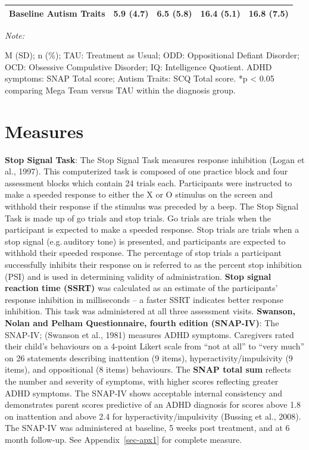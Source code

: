 \documentclass[
  letterpaper,
]{ut-thesis}
\begin{document}
\begin{table}
{\begin{threeparttable}
{\begin{tabular}{lcccc}
Baseline Autism Traits & 5.9 (4.7) & 6.5 (5.8) & 16.4 (5.1) & 16.8 (7.5)\\
\bottomrule
\end{tabular}}
\begin{tablenotes}[para]
\item \textit{Note: } 
\item M (SD); n (\%); TAU: Treatment as Usual; ODD: Oppositional Defiant Disorder; OCD: Obsessive Compulstive Disorder; IQ: Intelligence Quotient. ADHD symptoms: SNAP Total score; Autism Traits: SCQ Total score. *p < 0.05 comparing Mega Team versus TAU within the diagnosis group.
\end{tablenotes}
\end{threeparttable}

}

\end{table}%

\section{Measures}\label{measures}

\textbf{Stop Signal Task}: The Stop Signal Task measures response
inhibition (Logan et al., 1997). This computerized task is composed of
one practice block and four assessment blocks which contain 24 trials
each. Participants were instructed to make a speeded response to either
the X or O stimulus on the screen and withhold their response if the
stimulus was preceded by a beep. The Stop Signal Task is made up of go
trials and stop trials. Go trials are trials when the participant is
expected to make a speeded response. Stop trials are trials when a stop
signal (e.g.\,auditory tone) is presented, and participants are expected
to withhold their speeded response. The percentage of stop trials a
participant successfully inhibits their response on is referred to as
the percent stop inhibition (PSI) and is used in determining validity of
administration. \textbf{Stop signal reaction time (SSRT)} was calculated
as an estimate of the participants' response inhibition in milliseconds
-- a faster SSRT indicates better response inhibition. This task was
administered at all three assessment visits. \textbf{Swanson, Nolan and
Pelham Questionnaire, fourth edition (SNAP-IV)}: The SNAP-IV; (Swanson
et al., 1981) measures ADHD symptoms. Caregivers rated their child's
behaviours on a 4-point Likert scale from ``not at all'' to ``very
much'' on 26 statements describing inattention (9 items),
hyperactivity/impulsivity (9 items), and oppositional (8 items)
behaviours. The \textbf{SNAP total sum} reflects the number and severity
of symptoms, with higher scores reflecting greater ADHD symptoms. The
SNAP-IV shows acceptable internal consistency and demonstrates parent
scores predictive of an ADHD diagnosis for scores above 1.8 on
inattention and above 2.4 for hyperactivity/impulsivity (Bussing et al.,
2008). The SNAP-IV was administered at baseline, 5 weeks post treatment,
and at 6 month follow-up. See Appendix~\ref{sec-apx1} for complete
measure.
\end{document}
